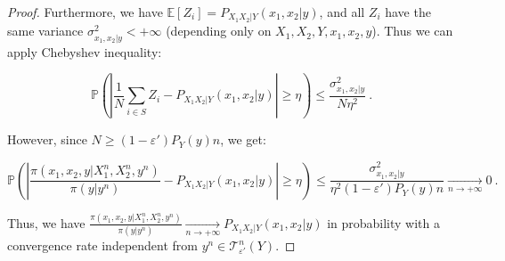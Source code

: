 \documentclass[11pt]{article}
\theoremstyle{definition}
\theoremstyle{remark}
\begin{document}
\begin{proof}
          Furthermore, we have $\mathbb{E}[Z_i] = P_{X_1X_2|Y}(x_1,x_2|y)$, and all $Z_i$ have the same variance $\sigma_{x_1,x_2|y}^2 < +\infty$ (depending only on $X_1,X_2,Y,x_1,x_2,y$). Thus we can apply Chebyshev inequality:

          \[ \mathbb{P}\left( \left|\frac{1}{N}\sum_{i \in S} Z_i - P_{X_1X_2|Y}(x_1,x_2|y) \right| \geq \eta \right) \leq \frac{\sigma_{x_1,x_2|y}^2}{N\eta^2} \ .\]

          However, since $N \geq (1-\varepsilon')P_Y(y)n$, we get:

          \[ \mathbb{P}\left( \left|\frac{\pi(x_1,x_2,y|X_1^n,X_2^n,y^n)}{\pi(y|y^n)} - P_{X_1X_2|Y}(x_1,x_2|y) \right| \geq \eta \right) \leq \frac{\sigma_{x_1,x_2|y}^2}{\eta^2(1-\varepsilon')P_Y(y)n} \underset{n \rightarrow +\infty}{\rightarrow} 0 \ .\]

          Thus, we have $\frac{\pi(x_1,x_2,y|X_1^n,X_2^n,y^n)}{\pi(y|y^n)} \underset{n \rightarrow +\infty}{\rightarrow} P_{X_1X_2|Y}(x_1,x_2|y)$ in probability with a convergence rate independent from $y^n \in \mathcal{T}^n_{\varepsilon'}(Y)$.
      \end{proof}
\end{document}
